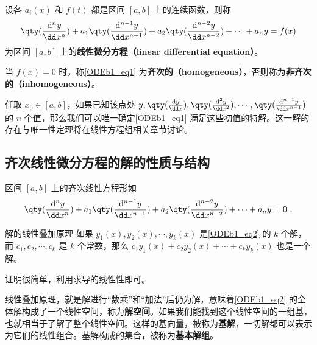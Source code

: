 

\begin{definition}{}
设各 $a_i(x)$ 和 $f(t)$ 都是区间 $[a, b]$ 上的连续函数，则称
\begin{equation}\label{ODEb1_eq1}
\qty(\frac{\mathrm{d}^n y}{\dd x^n})+a_1\qty(\frac{\mathrm{d}^{n-1} y}{\dd x^{n-1}})+a_2\qty(\frac{\mathrm{d}^{n-2} y}{\dd x^{n-2}})+\cdots+a_ny=f(x)
\end{equation}
为区间 $[a, b]$ 上的\textbf{线性微分方程（linear differential equation）}。

当 $f(x)=0$ 时，称\autoref{ODEb1_eq1} 为\textbf{齐次的（homogeneous）}，否则称为\textbf{非齐次的（inhomogeneous）}。
\end{definition}

任取 $x_0\in[a, b]$，如果已知该点处 $y, \qty(\frac{\mathrm{d} y}{\dd x}), \qty(\frac{\mathrm{d}^{2} y}{\dd x^{2}}), \cdots, \qty(\frac{\mathrm{d}^{n-1} y}{\dd x^{n-1}})$ 的 $n$ 个值，那么我们可以唯一确定\autoref{ODEb1_eq1} 满足这些初值的特解。这一解的存在与唯一性定理将在线性方程组相关章节讨论。


\subsection{齐次线性微分方程的解的性质与结构}

区间 $[a, b]$ 上的齐次线性方程形如
\begin{equation}\label{ODEb1_eq2}
\qty(\frac{\mathrm{d}^n y}{\dd x^n})+a_1\qty(\frac{\mathrm{d}^{n-1} y}{\dd x^{n-1}})+a_2\qty(\frac{\mathrm{d}^{n-2} y}{\dd x^{n-2}})+\cdots+a_ny=0~.
\end{equation}

\begin{theorem}{解的线性叠加原理}
如果 $y_1(x), y_2(x), \cdots, y_k(x)$ 是\autoref{ODEb1_eq2} 的 $k$ 个解，而 $c_1, c_2, \cdots, c_k$ 是 $k$ 个常数，那么 $c_1y_1(x)+c_2y_2(x)+\cdots+c_ky_k(x)$ 也是一个解。
\end{theorem}

证明很简单，利用求导的线性性即可。

线性叠加原理，就是解进行“数乘”和“加法”后仍为解，意味着\autoref{ODEb1_eq2} 的全体解构成了一个线性空间，称为\textbf{解空间}。如果我们能找到这个线性空间的一组基，也就相当于了解了整个线性空间。这样的基向量，被称为\textbf{基解}，一切解都可以表示为它们的线性组合。基解构成的集合，被称为\textbf{基本解组}。

